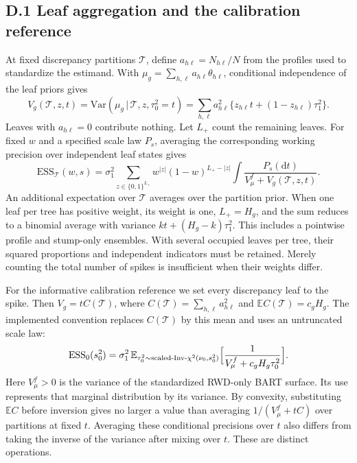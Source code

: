 \documentclass[11pt]{article}
\newcommand{\E}{\mathbb{E}}
\newcommand{\Var}{\mathrm{Var}}
\newcommand{\given}{\,\vert\,}
\newcommand{\dd}{\mathrm{d}}
\theoremstyle{definition}
\theoremstyle{plain}
\begin{document}
{\subsection*{D.1 Leaf aggregation and the calibration reference}

At fixed discrepancy partitions $\mathcal T$, define $a_{h\ell}=N_{h\ell}/N$ from the profiles used to standardize the estimand. With $\mu_g=\sum_{h,\ell}a_{h\ell}\theta_{h\ell}$, conditional independence of the leaf priors gives
\begin{equation}
V_g(\mathcal T,z,t)=\Var(\mu_g\given\mathcal T,z,\tau_0^2=t)
=\sum_{h,\ell}a_{h\ell}^2\{z_{h\ell}t+(1-z_{h\ell})\tau_1^2\}.
\label{eqA:leafvariance}
\end{equation}
Leaves with $a_{h\ell}=0$ contribute nothing. Let $L_+$ count the remaining leaves. For fixed $w$ and a specified scale law $P_s$, averaging the corresponding working precision over independent leaf states gives
\[
\mathrm{ESS}_{\mathcal T}(w,s)
=\sigma_1^2\sum_{z\in\{0,1\}^{L_+}}w^{|z|}(1-w)^{L_+-|z|}
 \int\frac{P_s(\dd t)}{V_\mu^f+V_g(\mathcal T,z,t)}.
\]
An additional expectation over $\mathcal T$ averages over the partition prior. When one leaf per tree has positive weight, its weight is one, $L_+=H_g$, and the sum reduces to a binomial average with variance $kt+(H_g-k)\tau_1^2$. This includes a pointwise profile and stump-only ensembles. With several occupied leaves per tree, their squared proportions and independent indicators must be retained. Merely counting the total number of spikes is insufficient when their weights differ.

For the informative calibration reference we set every discrepancy leaf to the spike. Then $V_g=tC(\mathcal T)$, where $C(\mathcal T)=\sum_{h,\ell}a_{h\ell}^2$ and $\E C(\mathcal T)=c_gH_g$. The implemented convention replaces $C(\mathcal T)$ by this mean and uses an untruncated scale law:
\begin{equation}
\ess_0(s_0^2)=\sigma_1^2\,\E_{\tau_0^2\sim\text{scaled-Inv-}\chi^2(\nu_0,s_0^2)}\Bigl[\frac{1}{V^f_\mu+c_gH_g\tau_0^2}\Bigr].
\label{eqA:ess0}
\end{equation}
Here $V_\mu^f>0$ is the variance of the standardized RWD-only BART surface. Its use represents that marginal distribution by its variance. By convexity, substituting $\E C$ before inversion gives no larger a value than averaging $1/(V_\mu^f+tC)$ over partitions at fixed $t$. Averaging these conditional precisions over $t$ also differs from taking the inverse of the variance after mixing over $t$. These are distinct operations.

}
\end{document}
